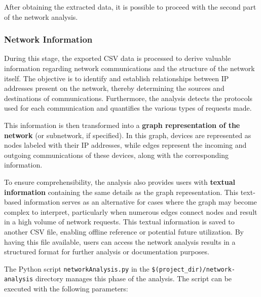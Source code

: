 \bigskip
After obtaining the extracted data, it is possible to proceed with the second part of the network analysis.

\vfill

\subsubsection{Network Information}
\label{subsubsec:4_draw_network}
During this stage, the exported CSV data is processed to derive valuable information regarding network communications and the structure of the network itself. The objective is to identify and establish relationships between IP addresses present on the network, thereby determining the sources and destinations of communications. Furthermore, the analysis detects the protocols used for each communication and quantifies the various types of requests made.

\bigskip
This information is then transformed into a \textbf{graph representation of the network} (or subnetwork, if specified). In this graph, devices are represented as nodes labeled with their IP addresses, while edges represent the incoming and outgoing communications of these devices, along with the corresponding information.

To ensure comprehensibility, the analysis also provides users with \textbf{textual information} containing the same details as the graph representation. This text-based information serves as an alternative for cases where the graph may become complex to interpret, particularly when numerous edges connect nodes and result in a high volume of network requests.\newline
This textual information is saved to another CSV file, enabling offline reference or potential future utilization. By having this file available, users can access the network analysis results in a structured format for further analysis or documentation purposes.

\bigskip
The Python script \texttt{networkAnalysis.py} in the \texttt{\$(project\_dir)/network-analysis} directory manages this phase of the analysis. The script can be executed with the following parameters:

